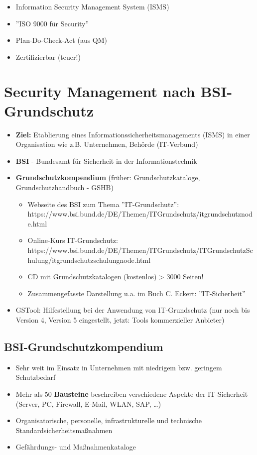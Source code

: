 \documentclass[openany]{book}
\begin{document}
\begin{itemize}
    \item Information Security Management System (ISMS)
    \item ''ISO 9000 für Security''
    \item Plan-Do-Check-Act (aus QM)
    \item Zertifizierbar (teuer!) 
\end{itemize}

\section{Security Management nach BSI-Grundschutz}

\begin{itemize}
    \item \textbf{Ziel:} Etablierung eines Informationssicherheitsmanagements (ISMS) in einer Organisation wie z.B. Unternehmen, Behörde (IT-Verbund)
    \item \textbf{BSI} - Bundesamt für Sicherheit in der Informationstechnik
    \item \textbf{Grundschutzkompendium} (früher: Grundschutzkataloge, Grundschutzhandbuch - GSHB)
    \begin{itemize}
        \item Webseite des BSI zum Thema ''IT-Grundschutz'': https://www.bsi.bund.de/DE/Themen/ITGrundschutz/itgrundschutz\textunderscore node.html
        \item Online-Kurs IT-Grundschutz: https://www.bsi.bund.de/DE/Themen/ITGrundschutz/ITGrundschutzSchulung/itgrundschutzschulung\textunderscore node.html
        \item CD mit Grundschutzkatalogen (kostenlos) > 3000 Seiten!
        \item Zusammengefasste Darstellung u.a. im Buch C. Eckert: ''IT-Sicherheit''
    \end{itemize}
    \item GSTool: Hilfestellung bei der Anwendung von IT-Grundschutz (nur noch bis Version 4, Version 5 eingestellt, jetzt: Tools kommerzieller Anbieter)
\end{itemize}

\subsection{BSI-Grundschutzkompendium}

\begin{itemize}
    \item Sehr weit im Einsatz in Unternehmen mit niedrigem bzw. geringem Schutzbedarf
    \item Mehr als 50 \textbf{Bausteine} beschreiben verschiedene Aspekte der IT-Sicherheit (Server, PC, Firewall, E-Mail, WLAN, SAP, \dots)
    \item Organisatorische, personelle, infrastrukturelle und technische Standardsicherheitsmaßnahmen
    \item Gefährdungs- und Maßnahmenkataloge
\end{itemize}
\end{document}

